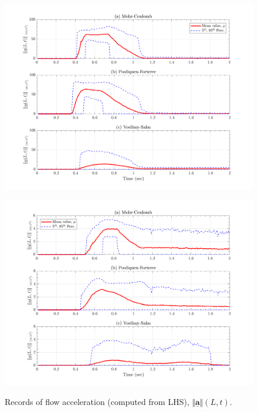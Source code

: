 \documentclass{article}
\begin{document}
\begin{figure}[H]
	\begin{minipage}[b]{0.5\linewidth}
    	\centering
    	\includegraphics[width=1\textwidth]{InclinedPlane/Acceleration/accel_L3L.png}
    	\label{fig:Ramp-L3-AccL}
	\end{minipage}
	\begin{minipage}[b]{0.5\linewidth}
		\centering
		\includegraphics[width=1\textwidth]{InclinedPlane/Acceleration/accel_L4L.png}
    	\label{fig:Ramp-L4-AccL}
    \end{minipage}
    \caption{Records of flow acceleration (computed from LHS), $\Vert \underline{\mathbf{a}} \Vert(L,t)$.}
    \label{fig:Ramp-LM-AccL}
\end{figure}
\end{document}
